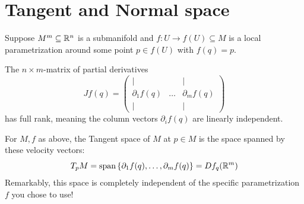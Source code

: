 \section{Tangent and Normal space}

Suppose $M^m \subseteq \mathbb{R}^n$ is a submanifold and $f: U \to f(U) \subseteq M$ is a local parametrization around some point $p \in f(U)$ with $f(q) = p$.

The $n \times m$-matrix of partial derivatives
\[ Jf(q) = \begin{pmatrix} | & & | \\ \partial_1 f(q) & \dots & \partial_m f(q) \\ | & & | \end{pmatrix} \]
has full rank, meaning the column vectors $\partial_i f(q)$ are linearly independent. 


\begin{definition*}
For $M, f$ as above, the Tangent space of $M$ at $p \in M$ is the space spanned by these velocity vectors:
\[ T_p M = \operatorname{span}\left\{ \partial_1 f(q), \dots, \partial_m f(q) \right\} = Df_q(\mathbb{R}^m) \]
Remarkably, this space is completely independent of the specific parametrization $f$ you chose to use!
\end{definition*}

